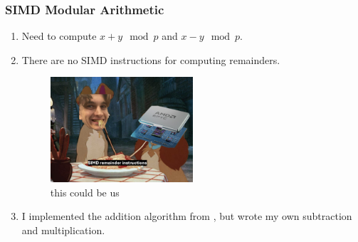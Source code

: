 \documentclass{beamer}
\begin{document}
\begin{frame}
    \frametitle{SIMD Modular Arithmetic}

    \begin{enumerate}[label=(\roman*)]
        \item Need to compute $x + y \mod p$ and $x - y \mod p$. \pause
            \medbreak

        \item There are no SIMD instructions for computing remainders.
            \begin{figure}
                \centering
                \includegraphics[width=0.5\textwidth]{this_could_be_us.png}
                \caption{this could be us}
            \end{figure}

            \pause \medbreak

        \item I implemented the addition algorithm from \cite{simd}, but wrote
            my own subtraction and multiplication.
    \end{enumerate}
\end{frame}

% 
% 
\end{document}

